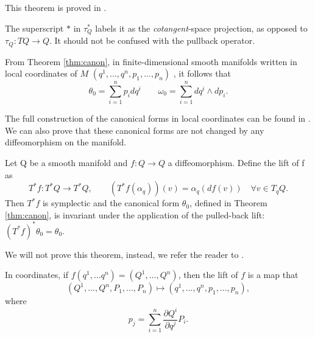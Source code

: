 \noindent This theorem is proved in \cite[Theorem 3.2.10]{abrahamFoundationsMechanics2008}.

\begin{remark}
	The superscript $*$ in $\tau^*_Q$ labels it as the \emph{cotangent}-space projection, as opposed to $\tau_Q: TQ \to Q$. It should not be confused with the pullback operator. 
\end{remark}

\begin{corollary}\label{crl:canon-coord}
	From Theorem \ref{thm:canon}, in finite-dimensional smooth manifolds written in local coordinates of $M$ $(q^1,...,q^n,p_1,...,p_n)$ , it follows that
	\[
		\theta_0 = \sum_{i=1}^n p_i dq^i \qquad \omega_0 = \sum_{i=1}^n dq^i \wedge dp_i.
	\]
\end{corollary}

\noindent The full construction of the canonical forms in local coordinates can be found in \cite[p.179]{abrahamFoundationsMechanics2008}. We can also prove that these canonical forms are not changed by any diffeomorphism on the manifold.

\begin{theorem}\label{thm:inv-canon}
	Let Q be a smooth manifold and $f: Q \to Q$ a diffeomorphism. Define the lift of f as
	\[
		T^*f : T^*Q \to T^*Q, \qquad (T^*f(\alpha_q))(v) = \alpha_q(df(v)) \quad \forall v \in T_qQ.
	\]
	Then $T^*f$ is symplectic and the canonical form $\theta_0$, defined in Theorem \ref{thm:canon}, is invariant under the application of the pulled-back lift:  $(T^*f)^*\theta_0 = \theta_0$.
\end{theorem}

\noindent We will not prove this theorem, instead, we refer the reader to \cite[Theorem 3.2.12]{abrahamFoundationsMechanics2008}.

\begin{remark}
	In coordinates, if $f(q^1,...q^n) = (Q^1,...,Q^n)$, then the lift of $f$ is a map that 
	\[
		(Q^1,...,Q^n, P_1,...,P_n) \mapsto (q^1,...,q^n, p_1,...,p_n),
	\] 
	where
	\[
		p_j = \sum_{i=1}^n \frac{\partial Q^i}{\partial q^j} P_i.
	\]
\end{remark}
